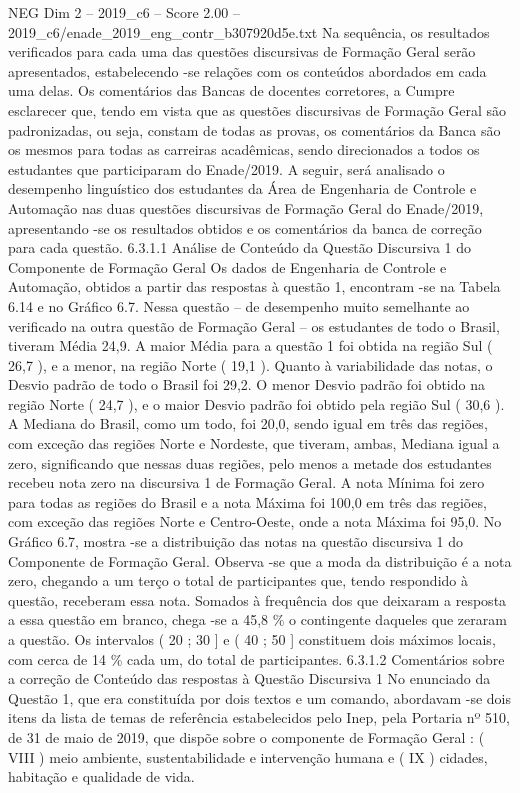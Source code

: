\begin{textsample}{NEG Dim 2 – 2019\_c6 – Score 2.00 – 2019\_c6/enade\_2019\_eng\_contr\_b307920d5e.txt}
Na sequência, os resultados verificados para cada uma das questões discursivas de Formação Geral serão apresentados, estabelecendo -se relações com os conteúdos abordados em cada uma delas.
Os comentários das Bancas de docentes corretores, a Cumpre esclarecer que, tendo em vista que as questões discursivas de Formação Geral são padronizadas, ou seja, constam de todas as provas, os comentários da Banca são os mesmos para todas as carreiras acadêmicas, sendo direcionados a todos os estudantes que participaram do Enade/2019.
A seguir, será analisado o desempenho linguístico dos estudantes da Área de Engenharia de Controle e Automação nas duas questões discursivas de Formação Geral do Enade/2019, apresentando -se os resultados obtidos e os comentários da banca de correção para cada questão. 6.3.1.1 Análise de Conteúdo da Questão Discursiva 1 do Componente de Formação Geral Os dados de Engenharia de Controle e Automação, obtidos a partir das respostas à questão 1, encontram -se na Tabela 6.14 e no Gráfico 6.7.
Nessa questão – de desempenho muito semelhante ao verificado na outra questão de Formação Geral – os estudantes de todo o Brasil, tiveram Média 24,9.
A maior Média para a questão 1 foi obtida na região Sul ( 26,7 ), e a menor, na região Norte ( 19,1 ).
Quanto à variabilidade das notas, o Desvio padrão de todo o Brasil foi 29,2.
O menor Desvio padrão foi obtido na região Norte ( 24,7 ), e o maior Desvio padrão foi obtido pela região Sul ( 30,6 ).
A Mediana do Brasil, como um todo, foi 20,0, sendo igual em três das regiões, com exceção das regiões Norte e Nordeste, que tiveram, ambas, Mediana igual a zero, significando que nessas duas regiões, pelo menos a metade dos estudantes recebeu nota zero na discursiva 1 de Formação Geral.
A nota Mínima foi zero para todas as regiões do Brasil e a nota Máxima foi 100,0 em três das regiões, com exceção das regiões Norte e Centro-Oeste, onde a nota Máxima foi 95,0.
No Gráfico 6.7, mostra -se a distribuição das notas na questão discursiva 1 do Componente de Formação Geral.
Observa -se que a moda da distribuição é a nota zero, chegando a um terço o total de participantes que, tendo respondido à questão, receberam essa nota.
Somados à frequência dos que deixaram a resposta a essa questão em branco, chega -se a 45,8 \% o contingente daqueles que zeraram a questão.
Os intervalos ( 20 ; 30 ] e ( 40 ; 50 ] constituem dois máximos locais, com cerca de 14 \% cada um, do total de participantes. 6.3.1.2 Comentários sobre a correção de Conteúdo das respostas à Questão Discursiva 1 No enunciado da Questão 1, que era constituída por dois textos e um comando, abordavam -se dois itens da lista de temas de referência estabelecidos pelo Inep, pela Portaria nº 510, de 31 de maio de 2019, que dispõe sobre o componente de Formação Geral : ( VIII ) meio ambiente, sustentabilidade e intervenção humana e ( IX ) cidades, habitação e qualidade de vida.

\end{textsample}
